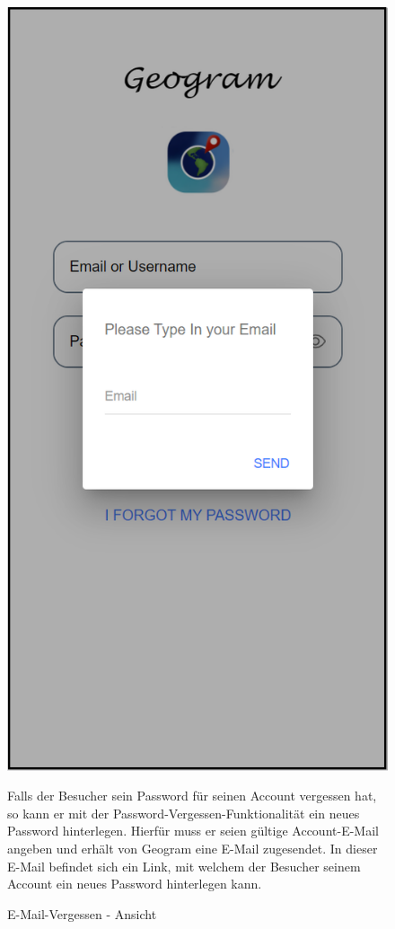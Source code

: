 \begin{figure}[H]
    \centering
    \begin{minipage}{.4\textwidth}
        \begin{center}
            \includegraphics[width=0.8\linewidth]{images/forgetemail.png}
        \end{center}
        \caption{E-Mail-Vergessen - Ansicht}
        \label{fig:forgetemail}
    \end{minipage}%
    \begin{minipage}{.6\textwidth}
        \begin{changemargin}{0.5cm}{0cm}            
            Falls der Besucher sein Password für seinen Account vergessen hat, so kann er mit der \glqq Password-Vergessen\grqq{}-Funktionalität ein neues Password hinterlegen. Hierfür muss er seien gültige Account-E-Mail angeben und erhält von Geogram eine E-Mail zugesendet. In dieser E-Mail befindet sich ein Link, mit welchem der Besucher seinem Account ein neues Password hinterlegen kann.
        \end{changemargin}
    \end{minipage}
\end{figure}

